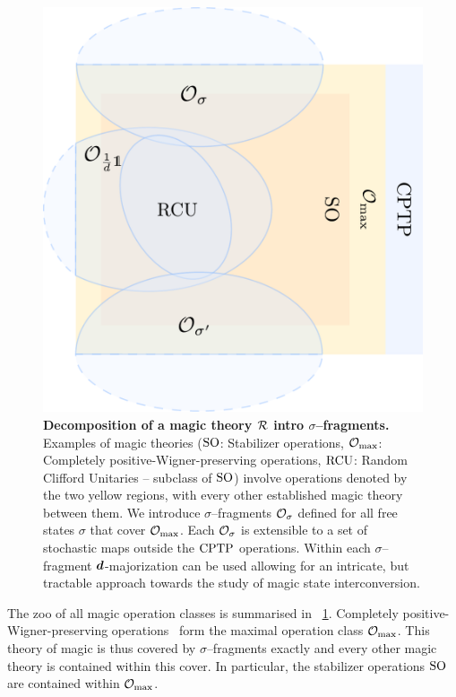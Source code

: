 \documentclass[pra,
aps,
twocolumn,
superscriptaddress,
groupedaddress,
nofootinbib,
reprint
]{revtex4-1}
\begin{document}
\begin{figure}[t]
    \centering
        \includegraphics[scale=0.47
        ]{figs/operations.pdf}
    \caption{\textbf{Decomposition of a magic theory $\mathcal{R}$ intro $\sigma$--fragments.} 
	Examples of magic theories (${\rm{SO}}$: Stabilizer operations, $\mathcal{O}_{\rm{max}}$: Completely positive-Wigner-preserving operations, ${\rm{RCU}}$: Random Clifford Unitaries -- subclass of ${\rm{SO}}$) involve operations denoted by the two yellow regions, with every other established magic theory  between them.
    We introduce $\sigma$--fragments $\mathcal{O}_\sigma$ defined for all free states $\sigma$ that cover $\mathcal{O}_{\rm{max}}$. 
    Each $\mathcal{O}_\sigma$ is extensible to a set of stochastic maps outside the ${\rm{CPTP}}$ operations.
    Within each $\sigma$--fragment $\bm{d}$-majorization can be used allowing for an intricate, but tractable approach towards the study of magic state interconversion.
    }
    \label{fig:zoo}
\end{figure}

The zoo of all magic operation classes is summarised in ~\cref{fig:zoo}.
Completely positive-Wigner-preserving operations~\cite{cit:wang} form the maximal operation class $\mathcal{O}_{\rm{max}}$.
This theory of magic is thus covered by $\sigma$--fragments exactly and every other magic theory is contained within this cover.
In particular, the stabilizer operations ${\rm{SO}}$ are contained within $\mathcal{O}_{\rm{max}}$.
\end{document}
